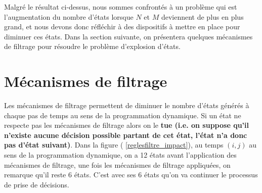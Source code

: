 Malgré le résultat ci-dessus, nous sommes confrontés à un problème qui est l'augmentation du nombre d'états lorsque $N$ et $M$ deviennent de plus en plus grand, et nous devons donc réfléchir à des dispositifs à mettre en place pour diminuer ces états. Dans la section suivante, on présentera quelques mécanismes de filtrage pour résoudre le problème d'explosion d'états.
\section{Mécanismes de filtrage}
\label{regles_de_filtrage}
Les mécanismes de filtrage permettent de diminuer le nombre d'états générés à chaque pas de temps au sens de la programmation dynamique. Si un état ne respecte pas les mécanismes de filtrage alors on le \textbf{tue (i.e. on suppose qu'il n'existe aucune décision possible partant de cet état, l'état n'a donc pas d'état suivant)}. Dans la figure (	\ref{reglesfiltre_impact}), au temps $(i,j)$ au sens de la programmation dynamique, on a 12 états avant l'application des mécanismes de filtrage, une fois les mécanismes de filtrage appliquées, on remarque qu'il reste 6 états. C'est avec ses 6 états qu'on va continuer le processus de prise de décisions.

